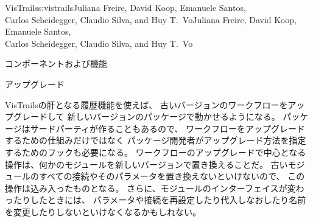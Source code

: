 \begin{aosachaptertoc}{VisTrails}{s:vistrails}{Juliana Freire, David Koop, Emanuele Santos, \\ Carlos Scheidegger, Claudio Silva, and Huy T.\ Vo}{Juliana Freire, David Koop, Emanuele Santos, \\ \hspace*{0.9cm} Carlos Scheidegger, Claudio Silva, and Huy T.\ Vo}
\begin{aosasect1}{コンポーネントおよび機能}
\begin{aosasect2}{アップグレード}
\label{sec.vistrails.upgrades}

VisTrailsの肝となる履歴機能を使えば、
古いバージョンのワークフローをアップグレードして
新しいバージョンのパッケージで動かせるようになる。
パッケージはサードパーティが作ることもあるので、
ワークフローをアップグレードするための仕組みだけではなく
パッケージ開発者がアップグレード方法を指定するためのフックも必要になる。
ワークフローのアップグレードで中心となる操作は、何かのモジュールを新しいバージョンで置き換えることだ。
古いモジュールのすべての接続やそのパラメータを置き換えないといけないので、
この操作は込み入ったものとなる。
さらに、モジュールのインターフェイスが変わったりしたときには、
パラメータや接続を再設定したり代入しなおしたり名前を変更したりしないといけなくなるかもしれない。


\end{aosasect2}
\end{aosasect1}
\end{aosachaptertoc}
